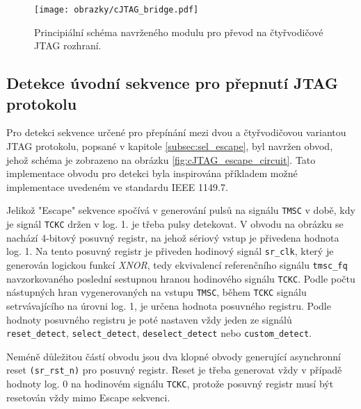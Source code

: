 \begin{figure}[!h]
  \begin{center}
    \texttt{[image: obrazky/cJTAG\_bridge.pdf]}
  \end{center}
  \caption{Principiální schéma navrženého modulu pro převod na čtyřvodičové \acs{JTAG} rozhraní.}
	\label{fig:cJTAG_bridge}
\end{figure}

\subsection{Detekce úvodní sekvence pro přepnutí \acs{JTAG} protokolu}	\label{subsec:sel_escape_det}
Pro detekci sekvence určené pro přepínání mezi dvou a čtyřvodičovou variantou \acs{JTAG} protokolu, popsané v kapitole \ref{subsec:sel_escape}, byl navržen obvod, jehož schéma je zobrazeno na obrázku \ref{fig:cJTAG_escape_circuit}. Tato implementace obvodu pro detekci byla inspirována příkladem možné implementace uvedeném ve standardu IEEE 1149.7.

Jelikož "Escape" sekvence spočívá v generování pulsů na signálu \texttt{\acs{TMSC}} v době, kdy je signál \texttt{\acs{TCKC}} držen v log. 1. je třeba pulsy detekovat. V obvodu na obrázku se nachází 4-bitový posuvný registr, na jehož sériový vstup je přivedena hodnota log. 1. Na tento posuvný registr je přiveden hodinový signál \texttt{sr\_clk}, který je generován logickou funkcí \textit{XNOR}, tedy ekvivalencí referenčního signálu \texttt{tmsc\_fq} navzorkovaného poslední sestupnou hranou hodinového signálu \texttt{\acs{TCKC}}. Podle počtu nástupných hran vygenerovaných na vstupu {\texttt{\acs{TMSC}}}, během {\texttt{\acs{TCKC}}} signálu setrvávajícího na úrovni log. 1, je určena hodnota posuvného registru. Podle hodnoty posuvného registru je poté nastaven vždy jeden ze signálů \texttt{reset\_detect}, \texttt{select\_detect}, \texttt{deselect\_detect} nebo \texttt{custom\_detect}. %

Neméně důležitou částí obvodu jsou dva klopné obvody generující asynchronní reset \texttt{(sr\_rst\_n)} pro posuvný registr. Reset je třeba generovat vždy v případě hodnoty log. 0 na hodinovém signálu {\texttt{\acs{TCKC}}}, protože posuvný registr musí být resetován vždy mimo Escape sekvenci. %

